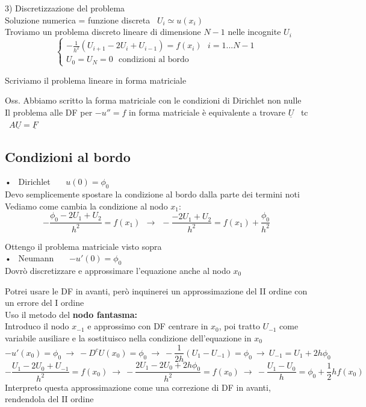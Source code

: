 \documentclass{article}
\renewcommand{\vv}[1]{\underline{#1}}
\begin{document}
3) Discretizzazione del problema\\
Soluzione numerica = funzione discreta \ $U_i\simeq u(x_i)$\\
Troviamo un problema discreto lineare di dimensione $N-1$ nelle incognite $U_i$\\
\[
\begin{cases}
-\frac{1}{h^2} (U_{i+1}-2U_i+U_{i-1})=f(x_i) \ \ \ i=1...N-1\\
U_0=U_N=0 \ \ \ \text{condizioni al bordo}
\end{cases}
\]

Scriviamo il problema lineare in forma matriciale


Oss. Abbiamo scritto la forma matriciale con le condizioni di Dirichlet non nulle\\

Il problema alle DF per $-u''=f$ in forma matriciale è equivalente a trovare $\vv{U}$ \ tc \ $A\vv{U}=\vv{F}$\\


\subsection{Condizioni al bordo}

• \ Dirichlet \ \ \ $u(0)=\phi_0$\\
Devo semplicemente spostare la condizione al bordo dalla parte dei termini noti\\
Vediamo come cambia la condizione al nodo $x_1$:
\[
-\frac{\phi_0 - 2 U_1 + U_2 }{h^2} = f(x_1) \ \ \longrightarrow \ \ -\frac{-2 U_1 + U_2 }{h^2} = f(x_1) + \frac{\phi_0}{h^2}
\]

Ottengo il problema matriciale visto sopra\\

• \ Neumann \ \ \ $-u'(0)=\phi_0$\\
Dovrò discretizzare e approssimare l'equazione anche al nodo $x_0$

Potrei usare le DF in avanti, però inquinerei un approssimazione del II ordine con un errore del I ordine\\

Uso il metodo del \textbf{nodo fantasma:}\\
Introduco il nodo $x_{-1}$ e approssimo con DF centrare in $x_0$, poi tratto $U_{-1}$ come variabile ausiliare e la sostituisco nella condizione dell'equazione in $x_0$
\[
-u'(x_0)=\phi_0 \ \to \ -D^c U(x_0)=\phi_0 \ \to \ -\frac{1}{2h}(U_1-U_{-1})=\phi_0 \ \to \ U_{-1}=U_1+2h\phi_0
\]
\[
-\frac{U_1 -2U_0 + U_{-1}}{h^2}=f(x_0) \ \to \ -\frac{2U_1-2U_0+2h\phi_0}{h^2} = f(x_0) \ \to \ -\frac{U_1-U_0}{h}=\phi_0 +\frac12 hf(x_0)
\]
Interpreto questa approssimazione come una correzione di DF in avanti, rendendola del II ordine\\
\end{document}
